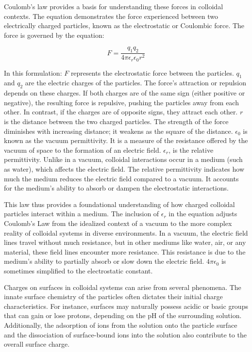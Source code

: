 Coulomb's law provides a basis for understanding these forces in colloidal contexts. The equation demonstrates the force experienced between two electrically charged particles, known as the electrostatic or Coulombic force. The force is governed by the
equation:

\begin{equation}
F = \frac{q_1q_2}{4 \pi \epsilon_r \epsilon_0 r^2}
\end{equation}

In this formulation:
$F$ represents the electrostatic force between the particles.
$q_1$ and $q_2$ are the electric charges of the particles. The force's attraction or repulsion depends on these charges. If both charges are of the same sign (either positive or negative), the resulting force is repulsive, pushing the particles away from each other. In contrast, if the charges are of opposite signs, they attract each other.
$r$ is the distance between the two charged particles. The strength of the force diminishes with increasing distance; it weakens as the square of the distance.
$\epsilon_0$ is known as the vacuum permittivity. It is a measure of the resistance offered by the vacuum of space to the formation of an electric field.
$\epsilon_r$, is the relative permittivity. Unlike in a vacuum, colloidal interactions occur in a medium (such as water), which affects the electric field. The relative permittivity indicates how much the medium reduces the electric field compared to a vacuum. It accounts for the medium's ability to absorb or dampen the electrostatic interactions.

This law thus provides a foundational understanding of how charged colloidal particles interact within a medium. The inclusion of $\epsilon_r$ in the equation adjusts Coulomb's Law from the idealized context of a vacuum to the more complex reality of colloidal systems in diverse environments. In a vacuum, the electric field lines travel without much resistance, but in other mediums like water, air, or any material, these field lines encounter more resistance. This resistance is due to the medium's ability to partially absorb or slow down the electric field. $4\pi \epsilon_0$ is sometimes simplified to the electrostatic constant. 

Charges on surfaces in colloidal systems can arise from several phenomena. The innate surface chemistry of the particles often dictates their initial charge characteristics. For instance, surfaces may naturally possess acidic or basic groups that can gain or lose protons, depending on the pH of the surrounding solution. Additionally, the adsorption of ions from the solution onto the particle surface and the dissociation of surface-bound ions into the solution also contribute to the overall surface charge.

